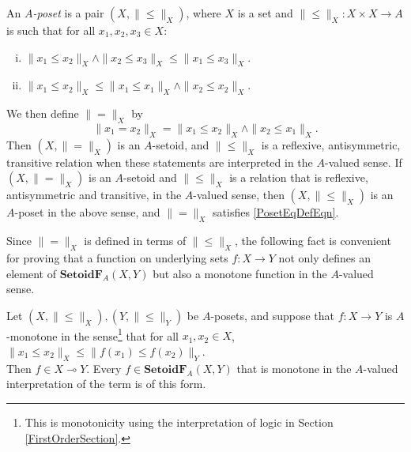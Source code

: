 \documentclass{lmcs}
\newcommand{\cat}[1]{\ensuremath{\mathbf{#1}}}
\newcommand{\homoid}{\multimap} %
\newcommand{\beq}{\|\mbox{$=$}\|}
\newcommand{\bleq}{\|\mbox{$\leq$}\|}
\newcommand{\SetoidF}{\cat{SetoidF}}
\begin{document}
\begin{defi}
	\label{BVPosetDef}
	An \emph{$A$-poset} is a pair $(X,\bleq_X)$, where $X$ is a set and $\bleq_X : X \times X \rightarrow A$ is such that for all $x_1,x_2,x_3 \in X$:
	\begin{enumerate}[(i)]
		\item  $\| x_1 \leq x_2 \|_X \land \| x_2 \leq x_3 \|_X \leq \| x_1 \leq x_3 \|_X.$
		
		\item $ \| x_1 \leq x_2 \|_X \leq \| x_1 \leq x_1 \|_X \land \| x_2 \leq x_2 \|_X.$
	\end{enumerate}
	We then define $\beq_X$ by
	\begin{equation}
		\label{PosetEqDefEqn}
		\| x_1 = x_2 \|_X = \| x_1 \leq x_2 \|_X \land \| x_2 \leq x_1 \|_X.
	\end{equation}
	Then $(X,\beq_X)$ is an $A$-setoid, and $\bleq_X$ is a reflexive, antisymmetric, transitive relation when these statements are interpreted in the $A$-valued sense. 
	If $(X,\beq_X)$ is an $A$-setoid and $\bleq_X$ is a relation that is reflexive, antisymmetric and transitive, in the $A$-valued sense, then $(X,\bleq_X)$ is an $A$-poset in the above sense, and $\beq_X$ satisfies \eqref{PosetEqDefEqn}.
\end{defi}

Since $\beq_X$ is defined in terms of $\bleq_X$, the following fact is convenient for proving that a function on underlying sets $f : X \rightarrow Y$ not only defines an element of $\SetoidF_A(X,Y)$ but also a monotone function in the $A$-valued sense.

\begin{lem}
	\label{MonotoneImpliesFunctionLemma}
	Let $(X,\bleq_X), (Y,\bleq_Y)$ be $A$-posets, and suppose that $f : X \rightarrow Y$ is $A$-monotone in the sense\footnote{This is monotonicity using the interpretation of logic in Section \ref{FirstOrderSection}.} that for all $x_1,x_2 \in X$,
	$
	\| x_1 \leq x_2 \|_X \leq \| f(x_1) \leq f(x_2) \|_Y.
	$
	\\Then $f \in X \homoid Y$. Every $f \in \SetoidF_A(X,Y)$ that is monotone in the $A$-valued interpretation of the term is of this form.
\end{lem}
\end{document}
